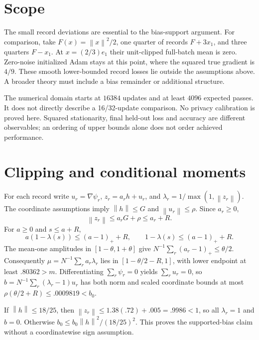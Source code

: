 \documentclass[11pt]{article}
\newcommand{\norm}[1]{\left\|#1\right\|}
\begin{document}
\section{Scope}
The small record deviations are essential to the bias-support argument.
For comparison, take $F(x)=\norm x^2/2$, one quarter of records
$F+3x_1$, and three quarters $F-x_1$. At $x=(2/3)e_1$ their unit-clipped
full-batch mean is zero. Zero-noise initialized Adam stays at this point,
where the squared true gradient is $4/9$. These smooth lower-bounded
record losses lie outside the assumptions above. A broader theory must
include a bias remainder or additional structure.

The numerical domain starts at $16384$ updates and at least $4096$ expected
passes. It does not directly describe a 16/32-update comparison. No privacy
calibration is proved here. Squared stationarity, final held-out loss and
accuracy are different observables; an ordering of upper bounds alone
does not order achieved performance.

\appendix
\section{Clipping and conditional moments}
For each record write $u_r=\nabla\psi_r$, $z_r=a_rh+u_r$, and
$\lambda_r=1/\max(1,\norm{z_r})$.
The coordinate assumptions imply $\norm h\le G$ and $\norm{u_r}\le\rho$.
Since $a_r\ge0$,
\[
 \norm{z_r}\le a_rG+\rho\le a_r+R.
\]
For $a\ge0$ and $s\le a+R$,
\[
 a(1-\lambda(s))\le(a-1)_++R,\qquad
 1-\lambda(s)\le(a-1)_++R.
\]
The mean-one amplitudes in $[1-\theta,1+\theta]$ give
$N^{-1}\sum_r(a_r-1)_+\le\theta/2$.
Consequently $\mu=N^{-1}\sum_ra_r\lambda_r$ lies in
$[1-\theta/2-R,1]$, with lower endpoint at least $.80362>m$.
Differentiating $\sum_r\psi_r=0$ yields $\sum_ru_r=0$, so
$b=N^{-1}\sum_r(\lambda_r-1)u_r$ has both norm and scaled coordinate
bounds at most $\rho(\theta/2+R)\le.0009819<b_0$.

If $\norm h\le18/25$, then
$\norm{z_r}\le1.38(.72)+.005=.9986<1$, so all $\lambda_r=1$ and $b=0$.
Otherwise $b_0\le b_0\norm h^2/(18/25)^2$. This proves the supported-bias
claim without a coordinatewise sign assumption.
\end{document}
